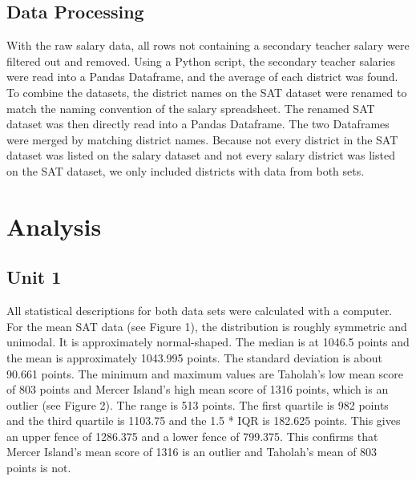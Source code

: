 \documentclass[11pt]{article} %
\begin{document}
\subsection{Data Processing}

With the raw salary data, all rows not containing a secondary teacher salary were filtered out and removed. Using a Python script, the secondary teacher salaries were read into a Pandas Dataframe, and the average of each district was found. To combine the datasets, the district names on the SAT dataset were renamed to match the naming convention of the salary spreadsheet. The renamed SAT dataset was then directly read into a Pandas Dataframe. The two Dataframes were merged by matching district names. Because not every district in the SAT dataset was listed on the salary dataset and not every salary district was listed on the SAT dataset, we only included districts with data from both sets.

\section{Analysis}

\subsection{Unit 1}

All statistical descriptions for both data sets were calculated with a computer. For the mean SAT data (see Figure 1), the distribution is roughly symmetric and unimodal. It is approximately normal-shaped. The median is at 1046.5 points and the mean is approximately 1043.995 points. The standard deviation is about 90.661 points. The minimum and maximum values are Taholah’s low mean score of 803 points and Mercer Island’s high mean score of 1316 points, which is an outlier (see Figure 2). The range is 513 points. The first quartile is 982 points and the third quartile is 1103.75 and the 1.5 * IQR is 182.625 points. This gives an upper fence of 1286.375 and a lower fence of 799.375. This confirms that Mercer Island’s mean score of 1316 is an outlier and Taholah’s mean of 803 points is not.
\end{document}
